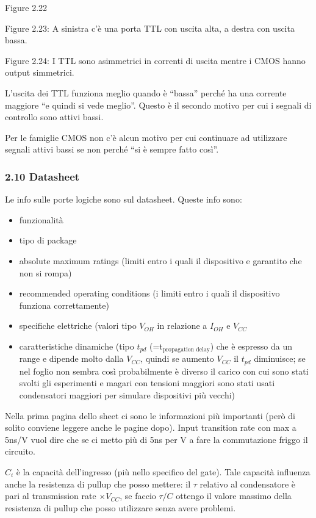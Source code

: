 \documentclass[
]{article}
\providecommand{\tightlist}{%
  \setlength{\itemsep}{0pt}\setlength{\parskip}{0pt}}
\begin{document}
Figure 2.22

Figure 2.23: A sinistra c'è una porta TTL con uscita alta, a destra con
uscita bassa.

Figure 2.24: I TTL sono asimmetrici in correnti di uscita mentre i CMOS
hanno output simmetrici.

L'uscita dei TTL funziona meglio quando è ``bassa'' perché ha una
corrente maggiore ``e quindi si vede meglio''. Questo è il secondo
motivo per cui i segnali di controllo sono attivi bassi.

Per le famiglie CMOS non c'è alcun motivo per cui continuare ad
utilizzare segnali attivi bassi se non perché ``si è sempre fatto
così''.

\subsubsection{2.10 Datasheet}\label{datasheet}

Le info sulle porte logiche sono sul datasheet. Queste info sono:

\begin{itemize}
\tightlist
\item
  funzionalità
\item
  tipo di package
\item
  absolute maximum ratings (limiti entro i quali il dispositivo e
  garantito che non si rompa)
\item
  recommended operating conditions (i limiti entro i quali il
  dispositivo funziona correttamente)
\item
  specifiche elettriche (valori tipo \(V_{OH}\) in relazione a
  \(I_{OH}\) e \(V_{CC}\)
\item
  caratteristiche dinamiche (tipo \(t_{pd}\)
  (=t\({}_{\text{propagation delay}}\)) che è espresso da un range e
  dipende molto dalla \(V_{CC}\), quindi se aumento \(V_{CC}\) il
  \(t_{pd}\) diminuisce; se nel foglio non sembra così probabilmente è
  diverso il carico con cui sono stati svolti gli esperimenti e magari
  con tensioni maggiori sono stati usati condensatori maggiori per
  simulare dispositivi più vecchi)
\end{itemize}

Nella prima pagina dello sheet ci sono le informazioni più importanti
(però di solito conviene leggere anche le pagine dopo). Input transition
rate con max a 5ns/V vuol dire che se ci metto più di 5ns per V a fare
la commutazione friggo il circuito.

\(C_{i}\) è la capacità dell'ingresso (più nello specifico del gate).
Tale capacità influenza anche la resistenza di pullup che posso mettere:
il \(\tau\) relativo al condensatore è pari al transmission rate
\(\times V_{CC}\), se faccio \(\tau/C\) ottengo il valore massimo della
resistenza di pullup che posso utilizzare senza avere problemi.
\end{document}
